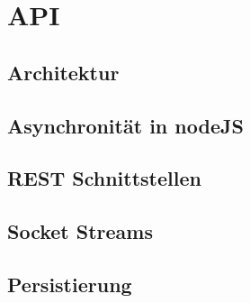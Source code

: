 %
%
%
%

\section{API}


\subsection{Architektur}

\subsection{Asynchronität in nodeJS}

\subsection{REST Schnittstellen}

\subsection{Socket Streams}

\subsection{Persistierung}
